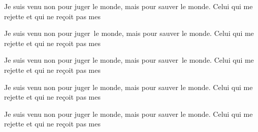 \documentclass{article}
\begin{document}
\begin{minipage}{1.7in}
Je suis venu non pour juger le monde, mais pour sauver le monde. Celui qui me rejette
et qui ne re\c coit pas mes
\end{minipage}

\bigskip
\begin{minipage}{1.7in}
Je suis venu non pour juger~le monde, mais pour sauver le monde. Celui qui me rejette
et qui ne re\c coit pas mes
\end{minipage}

\bigskip
\begin{minipage}{1.7in}
Je suis venu non pour juger le monde, mais pour sauver~le monde. Celui qui me rejette
et qui ne re\c coit pas mes
\end{minipage}

\bigskip
\begin{minipage}{1.6in}
Je suis venu non pour juger le monde, mais pour sauver le monde. Celui qui me rejette
et qui ne re\c coit pas mes
\end{minipage}

\bigskip
\begin{minipage}{1.8in}
Je suis venu non pour juger le monde, mais pour sauver le monde. Celui qui me rejette
et qui ne re\c coit pas mes
\end{minipage}
\end{document}
